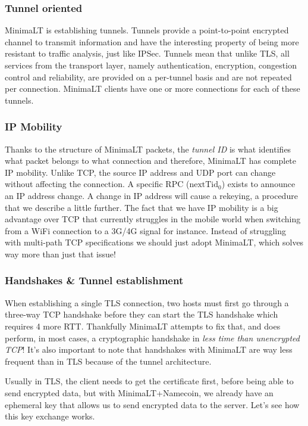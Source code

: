 \documentclass{vldb}
\begin{document}
\subsubsection{Tunnel oriented}

MinimaLT is establishing tunnels. Tunnels provide a point-to-point encrypted channel to transmit information and have the interesting property of being more resistant to traffic analysis, just like IPSec. Tunnels mean that unlike TLS, all services from the transport layer, namely authentication, encryption, congestion control and reliability, are provided on a per-tunnel basis and are not repeated per connection. MinimaLT clients have one or more connections for each of these tunnels.

\subsubsection{IP Mobility}

Thanks to the structure of MinimaLT packets, the \emph{tunnel ID} is what identifies what packet belongs to what connection and therefore, MinimaLT has complete IP mobility. Unlike TCP, the source IP address and UDP port can change without affecting the connection. A specific RPC (\emph{$\text{nextTid}_{0}$}) exists to announce an IP address change. A change in IP address will cause a rekeying, a procedure that we describe a little further. The fact that we have IP mobility is a big advantage over TCP that currently struggles in the mobile world when switching from a WiFi connection to a 3G/4G signal for instance. Instead of struggling with multi-path TCP specifications we should just adopt MinimaLT, which solves way more than just that issue! 

\subsubsection{Handshakes \& Tunnel establishment}

When establishing a single TLS connection, two hosts must first go through a three-way TCP  handshake before they can start the TLS handshake which requires 4 more RTT. Thankfully MinimaLT attempts to fix that, and does perform, in most cases, a cryptographic handshake in \emph{less time than unencrypted TCP}! It's also important to note that handshakes with MinimaLT are way less frequent than in TLS because of the tunnel architecture.

Usually in TLS, the client needs to get the certificate first, before being able to send encrypted data, but with MinimaLT+Namecoin, we already have an ephemeral key that allows us to send encrypted data to the server. Let's see how this key exchange works.
\end{document}

